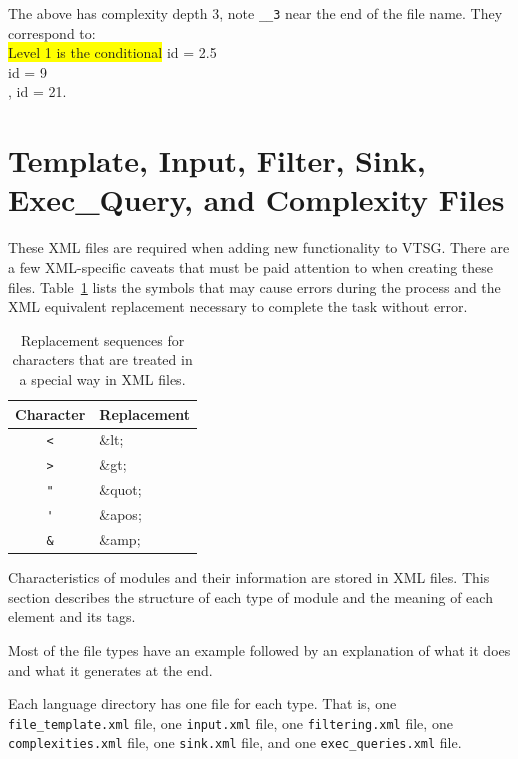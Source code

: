 \documentclass[12pt]{article}
\begin{document}
The above has complexity depth 3, note \verb|__3| near the end of 
the file
name. They correspond to:\\
{\colorbox{yellow}{Level 1 is the conditional}} id = 2.5\\
 id = 9\\
, id = 21.

\section{Template, Input, Filter, Sink, Exec\_Query, and Complexity Files}
\label{sec:source files}

These XML files are required when adding new functionality to VTSG.
There 
are a few XML-specific caveats that must be paid attention to when 
creating these files. 
Table~\ref{tab:XML escapes} lists the symbols that may cause errors 
during the process and the XML equivalent replacement necessary to 
complete the
task without error.

\begin{table}[H]
\centering
\begin{tabular}{|c|l|}
\hline
\textbf{Character} & \textbf{Replacement} \\
\hline
 \verb|<| & \&lt; \\
\hline
 \verb|>| & \&gt; \\
\hline
 \verb|"| & \&quot; \\
\hline
 \verb|'| & \&apos; \\
\hline
 \verb|&| & \&amp; \\
\hline
\end{tabular}
\caption{Replacement sequences for characters that are treated 
in a special way in XML files.}
\label{tab:XML escapes}
\end{table}

Characteristics of modules and their information are stored in 
XML files.  
This section describes the structure of each type of module and 
the meaning
of each element and its tags.

Most of the file types have an example followed by
an explanation of what it does and what it generates at the end.

Each language directory has one file for each type. That is, 
one \verb|file_template.xml| file, one \verb|input.xml| file, 
one \verb|filtering.xml| file, one \verb|complexities.xml| file,
one \verb|sink.xml| file, and one \verb|exec_queries.xml| file.
\end{document}
